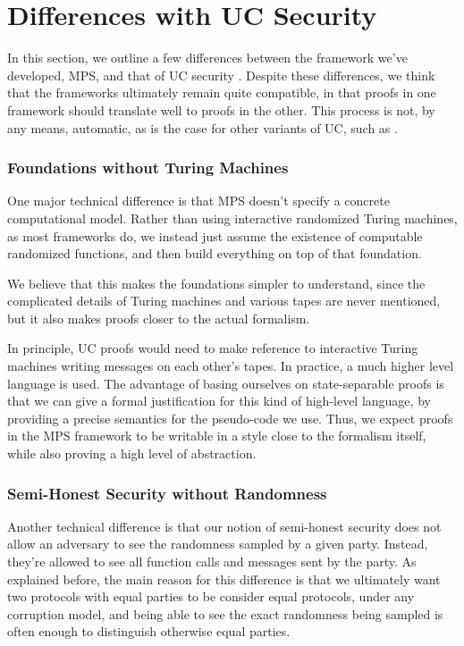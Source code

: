 \section{Differences with UC Security}

In this section, we outline a few differences between
the framework we've developed, MPS, and that of UC security
\cite{EPRINT:Canetti00}.
Despite these differences, we think that the frameworks
ultimately remain quite compatible, 
in that proofs in one framework should translate well
to proofs in the other.
This process is not, by any means, automatic,
as is the case for other variants of UC,
such as \cite{C:CanCohLin15}.

\subsubsection*{Foundations without Turing Machines}

One major technical difference is that MPS
doesn't specify a concrete computational model.
Rather than using interactive randomized Turing machines,
as most frameworks do, we instead just
assume the existence of computable randomized functions,
and then build everything on top of that foundation.

We believe that this makes the foundations simpler to understand,
since the complicated details of Turing machines and various
tapes are never mentioned, but it also
makes proofs closer to the actual formalism.

In principle, UC proofs would need to make reference
to interactive Turing machines writing messages on each other's
tapes.
In practice, a much higher level language is used.
The advantage of basing ourselves on state-separable proofs
is that we can give a formal justification for this kind
of high-level language, by providing a precise semantics
for the pseudo-code we use.
Thus, we expect proofs in the MPS framework to be writable
in a style close to the formalism itself,
while also proving a high level of abstraction.

\subsubsection*{Semi-Honest Security without Randomness}

Another technical difference is that our notion of semi-honest
security does not allow an adversary to see the randomness
sampled by a given party.
Instead, they're allowed to see all function calls
and messages sent by the party.
As explained before, the main reason for this difference
is that we ultimately want two protocols
with equal parties to be consider equal protocols,
under any corruption model, and being able to see the
exact randomness being sampled is often enough to distinguish
otherwise equal parties.


